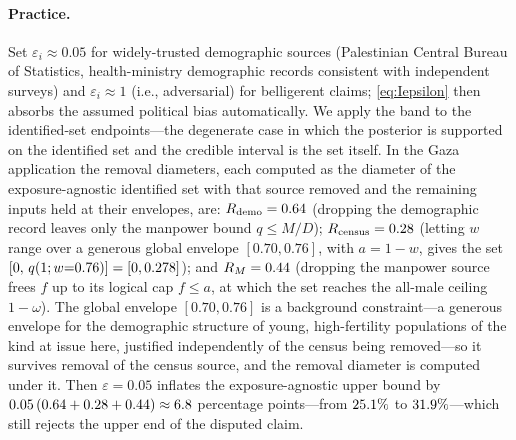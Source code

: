 \paragraph{Practice.} Set $\varepsilon_i\approx 0.05$ for widely-trusted demographic sources (Palestinian Central Bureau of Statistics, health-ministry demographic records consistent with independent surveys) and $\varepsilon_i\approx 1$ (i.e., adversarial) for belligerent claims; \eqref{eq:Iepsilon} then absorbs the assumed political bias automatically. We apply the band to the identified-set endpoints---the degenerate case in which the posterior is supported on the identified set and the credible interval is the set itself. In the Gaza application the removal diameters, each computed as the diameter of the exposure-agnostic identified set with that source removed and the remaining inputs held at their envelopes, are: $R_{\mathrm{demo}}=0.64{}$ (dropping the demographic record leaves only the manpower bound $q\le M/D$); $R_{\mathrm{census}}=0.28{}$ (letting $w$ range over a generous global envelope $[0.70,0.76]$, with $a=1-w$, gives the set $[0,\,q(1;w{=}0.76)]=[0,0.278{}]$); and $R_M=0.44{}$ (dropping the manpower source frees $f$ up to its logical cap $f\le a$, at which the set reaches the all-male ceiling $1-\omega$). The global envelope $[0.70,0.76]$ is a background constraint---a generous envelope for the demographic structure of young, high-fertility populations of the kind at issue here, justified independently of the census being removed---so it survives removal of the census source, and the removal diameter is computed under it. Then $\varepsilon=0.05$ inflates the exposure-agnostic upper bound by $0.05\,(0.64{}+0.28{}+0.44{})\approx 6.8{}$ percentage points---from $25.1{}\%$ to $31.9{}\%$---which still rejects the upper end of the disputed claim.

